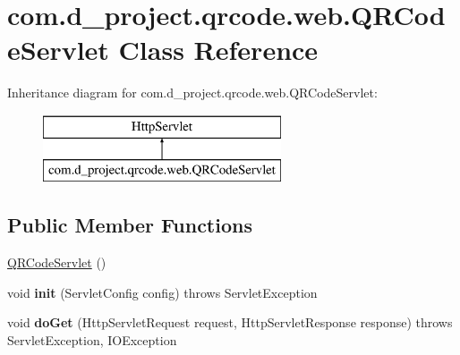 \hypertarget{classcom_1_1d__project_1_1qrcode_1_1web_1_1_q_r_code_servlet}{}\section{com.\+d\+\_\+project.\+qrcode.\+web.\+Q\+R\+Code\+Servlet Class Reference}
\label{classcom_1_1d__project_1_1qrcode_1_1web_1_1_q_r_code_servlet}
Inheritance diagram for com.\+d\+\_\+project.\+qrcode.\+web.\+Q\+R\+Code\+Servlet\+:\begin{figure}[H]
\begin{center}
\leavevmode
\includegraphics[height=2.000000cm]{classcom_1_1d__project_1_1qrcode_1_1web_1_1_q_r_code_servlet}
\end{center}
\end{figure}
\subsection*{Public Member Functions}
\begin{DoxyCompactItemize}
\item 
\hyperlink{classcom_1_1d__project_1_1qrcode_1_1web_1_1_q_r_code_servlet_a564a560bec02b1ed4d4a4cf44da20210}{Q\+R\+Code\+Servlet} ()
\item 
\mbox{\label{classcom_1_1d__project_1_1qrcode_1_1web_1_1_q_r_code_servlet_ab1a27de5bd54f16a7854ca8926553f08}} 
void {\bfseries init} (Servlet\+Config config)  throws Servlet\+Exception 
\item 
\mbox{\label{classcom_1_1d__project_1_1qrcode_1_1web_1_1_q_r_code_servlet_a29060e09bfb4b7dae4497e12d30ecf53}} 
void {\bfseries do\+Get} (Http\+Servlet\+Request request, Http\+Servlet\+Response response)  throws Servlet\+Exception, I\+O\+Exception 
\end{DoxyCompactItemize}


